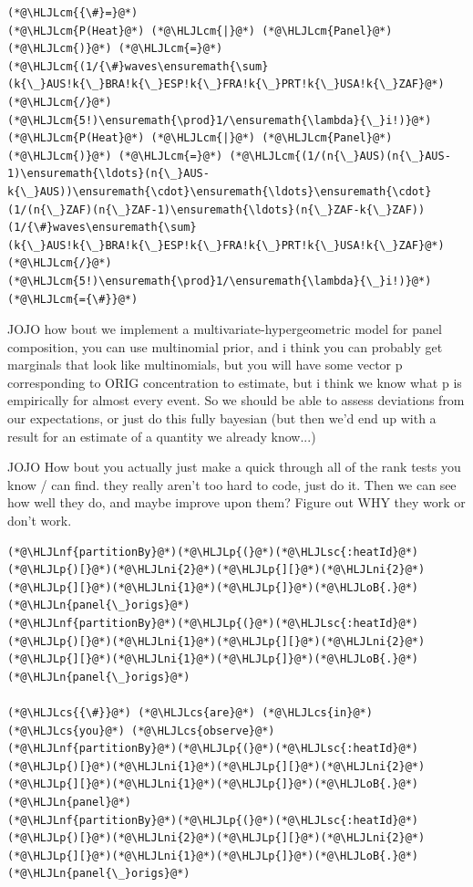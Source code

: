 \documentclass[12pt,a4paper]{article}
\newcommand{\HLJLn}[1]{#1}
\newcommand{\HLJLnf}[1]{\textcolor[RGB]{66,102,213}{#1}}
\newcommand{\HLJLsc}[1]{\textcolor[RGB]{201,61,57}{#1}}
\newcommand{\HLJLni}[1]{\textcolor[RGB]{59,151,46}{#1}}
\newcommand{\HLJLoB}[1]{\textcolor[RGB]{102,102,102}{\textbf{#1}}}
\newcommand{\HLJLp}[1]{#1}
\newcommand{\HLJLcm}[1]{\textcolor[RGB]{153,153,119}{\textit{#1}}}
\newcommand{\HLJLcs}[1]{\textcolor[RGB]{153,153,119}{\textit{#1}}}
\begin{document}
\begin{lstlisting}
(*@\HLJLcm{{\#}=}@*)
(*@\HLJLcm{P(Heat}@*) (*@\HLJLcm{|}@*) (*@\HLJLcm{Panel}@*) (*@\HLJLcm{)}@*) (*@\HLJLcm{=}@*) (*@\HLJLcm{(1/{\#}waves\ensuremath{\sum}(k{\_}AUS!k{\_}BRA!k{\_}ESP!k{\_}FRA!k{\_}PRT!k{\_}USA!k{\_}ZAF}@*) (*@\HLJLcm{/}@*) (*@\HLJLcm{5!)\ensuremath{\prod}1/\ensuremath{\lambda}{\_}i!)}@*) 
(*@\HLJLcm{P(Heat}@*) (*@\HLJLcm{|}@*) (*@\HLJLcm{Panel}@*) (*@\HLJLcm{)}@*) (*@\HLJLcm{=}@*) (*@\HLJLcm{(1/(n{\_}AUS)(n{\_}AUS-1)\ensuremath{\ldots}(n{\_}AUS-k{\_}AUS))\ensuremath{\cdot}\ensuremath{\ldots}\ensuremath{\cdot}(1/(n{\_}ZAF)(n{\_}ZAF-1)\ensuremath{\ldots}(n{\_}ZAF-k{\_}ZAF))(1/{\#}waves\ensuremath{\sum}(k{\_}AUS!k{\_}BRA!k{\_}ESP!k{\_}FRA!k{\_}PRT!k{\_}USA!k{\_}ZAF}@*) (*@\HLJLcm{/}@*) (*@\HLJLcm{5!)\ensuremath{\prod}1/\ensuremath{\lambda}{\_}i!)}@*) 
(*@\HLJLcm{={\#}}@*)
\end{lstlisting}


JOJO how bout we implement a multivariate-hypergeometric model for panel composition, you can use multinomial prior, and i think you can probably get marginals that look like multinomials, but you will have some vector p corresponding to ORIG concentration to estimate, but i think we know what p is empirically for almost every event. So we should be able to assess deviations from our expectations, or just do this fully bayesian (but then we'd end up with a result for an estimate of a quantity we already know...)


JOJO How bout you actually just make a quick through all of the rank tests you know / can find. they really aren't too hard to code, just do it. Then we can see how well they do, and maybe improve upon them? Figure out WHY they work or don't work.


\begin{lstlisting}
(*@\HLJLnf{partitionBy}@*)(*@\HLJLp{(}@*)(*@\HLJLsc{:heatId}@*)(*@\HLJLp{)[}@*)(*@\HLJLni{2}@*)(*@\HLJLp{][}@*)(*@\HLJLni{2}@*)(*@\HLJLp{][}@*)(*@\HLJLni{1}@*)(*@\HLJLp{]}@*)(*@\HLJLoB{.}@*)(*@\HLJLn{panel{\_}origs}@*)
(*@\HLJLnf{partitionBy}@*)(*@\HLJLp{(}@*)(*@\HLJLsc{:heatId}@*)(*@\HLJLp{)[}@*)(*@\HLJLni{1}@*)(*@\HLJLp{][}@*)(*@\HLJLni{2}@*)(*@\HLJLp{][}@*)(*@\HLJLni{1}@*)(*@\HLJLp{]}@*)(*@\HLJLoB{.}@*)(*@\HLJLn{panel{\_}origs}@*)

(*@\HLJLcs{{\#}}@*) (*@\HLJLcs{are}@*) (*@\HLJLcs{in}@*) (*@\HLJLcs{you}@*) (*@\HLJLcs{observe}@*)
(*@\HLJLnf{partitionBy}@*)(*@\HLJLp{(}@*)(*@\HLJLsc{:heatId}@*)(*@\HLJLp{)[}@*)(*@\HLJLni{1}@*)(*@\HLJLp{][}@*)(*@\HLJLni{2}@*)(*@\HLJLp{][}@*)(*@\HLJLni{1}@*)(*@\HLJLp{]}@*)(*@\HLJLoB{.}@*)(*@\HLJLn{panel}@*)
(*@\HLJLnf{partitionBy}@*)(*@\HLJLp{(}@*)(*@\HLJLsc{:heatId}@*)(*@\HLJLp{)[}@*)(*@\HLJLni{2}@*)(*@\HLJLp{][}@*)(*@\HLJLni{2}@*)(*@\HLJLp{][}@*)(*@\HLJLni{1}@*)(*@\HLJLp{]}@*)(*@\HLJLoB{.}@*)(*@\HLJLn{panel{\_}origs}@*)
\end{lstlisting}
\end{document}

